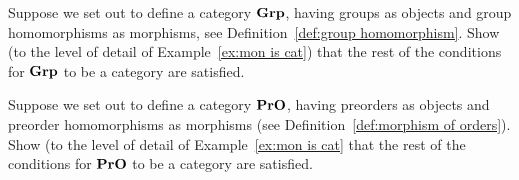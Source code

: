 \documentclass[CT4S-EN-RU]{subfiles}
\begin{document}
\begin{exerciseENG}
Suppose we set out to define a category ${\mathbf{Grp}}$, having groups as objects and group homomorphisms as morphisms, see Definition~\ref{def:group homomorphism}. Show (to the level of detail of Example~\ref{ex:mon is cat}) that the rest of the conditions for ${\mathbf{Grp}}$ to be a category are satisfied.
\end{exerciseENG}

\begin{exerciseRUS}
\end{exerciseRUS}

\begin{exerciseENG}
Suppose we set out to define a category ${\mathbf{PrO}}$, having preorders as objects and preorder homomorphisms as morphisms (see Definition~\ref{def:morphism of orders}). Show (to the level of detail of Example~\ref{ex:mon is cat} that the rest of the conditions for ${\mathbf{PrO}}$ to be a category are satisfied.
\end{exerciseENG}

\begin{exerciseRUS}
\end{exerciseRUS}
\end{document}
